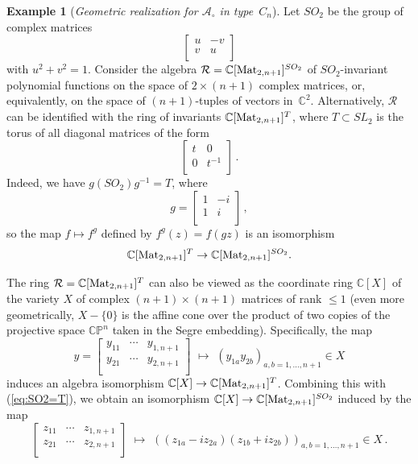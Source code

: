 \documentclass[letterpaper]{amsart}
\numberwithin{equation}{section}
\theoremstyle{definition}
\newtheorem{example}[theorem]{Example}
\def\AA{\mathcal{A}}
\def\CC{\mathbb{C}}
\newcommand{\bmat}[4]{\left[\!\!\begin{array}{cc} 
#1 & #2 \\ #3 & #4 \\ 
\end{array}\!\!\right]}
\begin{document}
\begin{example} 
[\emph{Geometric realization for $\AA_\circ$ in type~$C_n$}] 
\label{ex:realization-Cn} 
Let $SO_2$ be the group of complex matrices 
\[ 
\bmat{u}{-v}{v}{u} 
\] 
with $u^2+v^2 = 1$. 
Consider the algebra $\mathcal{R} = \CC[{\rm Mat}_{2,n+1}]^{SO_2}$ 
of $SO_2$-invariant polynomial functions 
on the space of $2 \times (n+1)$ complex matrices, 
or, equivalently, on the space of 
$(n+1)$-tuples of vectors in~$\CC^2$. 
Alternatively, $\mathcal{R}$ can be identified with the ring 
of invariants 
$\CC[{\rm Mat}_{2,n+1}]^T$, where $T\subset SL_2$ is the torus of all 
diagonal matrices of the form 
\[ 
\bmat{t}{0}{0}{t^{-1}}\,. 
\] 
Indeed, we have $g(SO_2) g^{-1} = T$, where 
\[ 
g = \bmat{1}{-i}{1}{i}\,, 
\] 
so the map $f \mapsto f^g$  defined by 
$f^g(z) = f(gz)$ is an isomorphism 
\begin{equation} 
\label{eq:SO2=T} 
\CC[{\rm Mat}_{2,n+1}]^T \to \CC[{\rm Mat}_{2,n+1}]^{SO_2}. 
\end{equation} 
 
The ring $\mathcal{R}=\CC[{\rm Mat}_{2,n+1}]^T$ can 
also be viewed as the coordinate ring $\CC[X]$ of the variety 
$X$ of complex $(n+1) \times (n+1)$ matrices of rank $\leq 1$ 
(even more geometrically, $X - \{0\}$ is the affine cone over the 
product of two copies of the projective space $\mathbb{CP}^n$ taken in the 
Segre embedding). 
Specifically, the map 
\[ 
y=\left[\!\!\begin{array}{ccc} 
y_{11} & \cdots & y_{1,n+1}\\ 
y_{21} & \cdots & y_{2,n+1}\\ 
\end{array}\!\!\right] \,\, 
\mapsto \,\, (y_{1a}y_{2b})_{a,b= 1, \dots, n+1} \in X 
\] 
induces an algebra isomorphism 
$\CC[X] \to \CC[{\rm Mat}_{2,n+1}]^T$. 
Combining this with (\ref{eq:SO2=T}), we obtain an isomorphism 
$\CC[X] \to \CC[{\rm Mat}_{2,n+1}]^{SO_2}$ induced by the map 
\[ 
\left[\!\!\begin{array}{ccc} 
z_{11} & \cdots & z_{1,n+1}\\ 
z_{21} & \cdots & z_{2,n+1}\\ 
\end{array}\!\!\right] \,\, 
\mapsto \,\, ((z_{1a} - i z_{2a})(z_{1b} + i z_{2b}))_{a,b= 1, 
\dots, n+1} \in X \,. 
\] 
 
 
 

\end{example}
\end{document}
